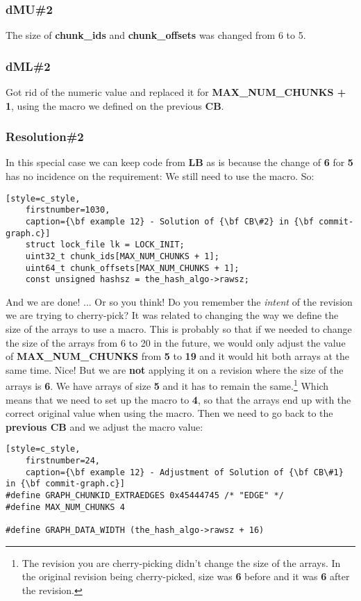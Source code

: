 \subsubsection{dMU\#2}
The size of {\bf chunk\_ids} and {\bf chunk\_offsets} was changed from 6 to 5.

\subsubsection{dML\#2}
Got rid of the numeric value and replaced it for {\bf MAX\_NUM\_CHUNKS + 1}, using the macro we defined on the previous {\bf CB}.

\subsubsection{Resolution\#2}
In this special case we can keep code from {\bf LB} as is because the change of {\bf 6} for {\bf 5} has no incidence on the requirement:
We still need to use the macro. So:
\begin{lstlisting}[style=c_style,
	firstnumber=1030,
	caption={\bf example 12} - Solution of {\bf CB\#2} in {\bf commit-graph.c}]
	struct lock_file lk = LOCK_INIT;
	uint32_t chunk_ids[MAX_NUM_CHUNKS + 1];
	uint64_t chunk_offsets[MAX_NUM_CHUNKS + 1];
	const unsigned hashsz = the_hash_algo->rawsz;
\end{lstlisting}

And we are done!
... Or so you think! Do you remember the {\it intent} of the revision we are trying to cherry-pick? It was related to
changing the way we define the size of the arrays to use a macro. This is probably so that if we needed to change the size of the
arrays from 6 to 20 in the future, we would only adjust the value of {\bf MAX\_NUM\_CHUNKS} from {\bf 5} to {\bf 19} and it would hit
both arrays at the same time. Nice! But we are {\bf not} applying it on a revision where the size of the arrays is {\bf 6}. We have
arrays of size {\bf 5} and it has to remain the same.\footnote{The revision you are cherry-picking didn't change the size of the arrays.
In the original revision being cherry-picked, size was {\bf 6} before and it was {\bf 6} after the revision.} Which means that we need to
set up the macro to {\bf 4}, so that the arrays end up with the correct original value when using the macro. Then we need to go back to
the {\bf previous CB} and we adjust the macro value:

\begin{lstlisting}[style=c_style,
	firstnumber=24,
	caption={\bf example 12} - Adjustment of Solution of {\bf CB\#1} in {\bf commit-graph.c}]
#define GRAPH_CHUNKID_EXTRAEDGES 0x45444745 /* "EDGE" */
#define MAX_NUM_CHUNKS 4

#define GRAPH_DATA_WIDTH (the_hash_algo->rawsz + 16)
\end{lstlisting}

